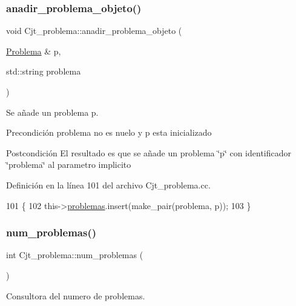 \subsubsection{\texorpdfstring{anadir\+\_\+problema\+\_\+objeto()}{anadir\_problema\_objeto()}}
{\footnotesize\ttfamily void Cjt\+\_\+problema\+::anadir\+\_\+problema\+\_\+objeto (\begin{DoxyParamCaption}\item[{\mbox{\hyperlink{class_problema}{Problema}} \&}]{p,  }\item[{std\+::string}]{problema }\end{DoxyParamCaption})}



Se añade un problema p. 

\begin{DoxyPrecond}{Precondición}
problema no es nuelo y p esta inicializado 
\end{DoxyPrecond}
\begin{DoxyPostcond}{Postcondición}
El resultado es que se añade un problema \char`\"{}p\char`\"{} con identificador \char`\"{}problema\char`\"{} al parametro implicito 
\end{DoxyPostcond}


Definición en la línea 101 del archivo Cjt\+\_\+problema.\+cc.


\begin{DoxyCode}
101                                                                       \{
102   this->\mbox{\hyperlink{class_cjt__problema_a2d471986320805c5b27f8d14d486fca8}{problemas}}.insert(make\_pair(problema, p));
103 \}
\end{DoxyCode}
\mbox{\label{class_cjt__problema_acf0fca6955f991a9debb4ef50ece8905}} 
\subsubsection{\texorpdfstring{num\+\_\+problemas()}{num\_problemas()}}
{\footnotesize\ttfamily int Cjt\+\_\+problema\+::num\+\_\+problemas (\begin{DoxyParamCaption}{ }\end{DoxyParamCaption})}



Consultora del numero de problemas. 

